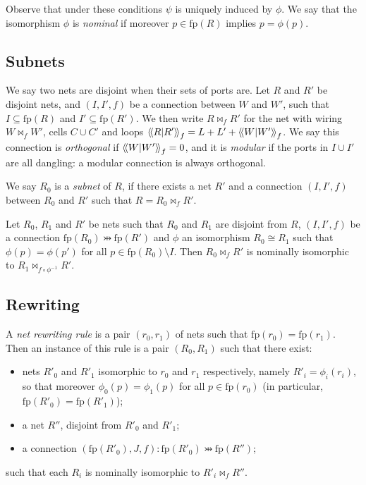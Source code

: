 Observe that under these conditions \(\psi\) is uniquely induced by
\(\phi\). We say that the isomorphism \(\phi\) is \emph{nominal} if
moreover \(p\in\textrm{fp}(R)\) implies \(p=\phi(p)\).

\subsection{Subnets}\label{subnets}

We say two nets are disjoint when their sets of ports are. Let \(R\) and
\(R'\) be disjoint nets, and \((I,I',f)\) be a connection between \(W\)
and \(W'\), such that \(I\subseteq \textrm{fp}(R)\) and
\(I'\subseteq \textrm{fp}(R')\). We then write \(R\bowtie_f{R'}\) for
the net with wiring \(W\bowtie_f{W'}\), cells \(C\cup C'\) and loops
\(\left\langle\!\left\langle R\middle|R'\right\rangle\!\right\rangle_f=L+L'+\left\langle\!\left\langle W\middle|W'\right\rangle\!\right\rangle_f\). We say this connection is
\emph{orthogonal} if \(\left\langle\!\left\langle W\middle|W'\right\rangle\!\right\rangle_f=0\), and it is \emph{modular} if
the ports in \(I\cup I'\) are all dangling: a modular connection is
always orthogonal.

We say \(R_0\) is a \emph{subnet} of \(R\), if there exists a net \(R'\)
and a connection \((I,I',f)\) between \(R_0\) and \(R'\) such that
\(R=R_0\bowtie_f{R'}\).

\begin{lemma}
Let $R_0$, $R_1$ and $R'$ be nets such that $R_0$ and $R_1$
are disjoint from $R$,
$(I,I',f)$ be a connection $\textrm{fp}(R_0)\pinj \textrm{fp}(R')$
and $\phi$ an isomorphism $R_0\cong R_1$ such that
$\phi(p)=\phi(p')$ for all $p\in\textrm{fp}(R_0)\setminus I$.
Then $R_0\bowtie_f{R'}$ is nominally isomorphic to
$R_1\bowtie_{f\circ\phi^{-1}}{R'}$.
\end{lemma}

\subsection{Rewriting}\label{rewriting}

A \emph{net rewriting rule} is a pair \((r_0,r_1)\) of nets such that
\(\textrm{fp}(r_0)=\textrm{fp}(r_1)\). Then an instance of this rule is
a pair \((R_0,R_1)\) such that there exist:
\begin{itemize}
\item nets \(R'_0\) and \(R'_1\) isomorphic to \(r_0\) and \(r_1\)
  respectively, namely \(R'_i=\phi_i(r_i)\), so that moreover
  \(\phi_0(p)=\phi_1(p)\) for all \(p\in\textrm{fp}(r_0)\) (in
  particular, \(\textrm{fp}(R'_0)=\textrm{fp}(R'_1)\));
\item a net \(R''\), disjoint from \(R'_0\) and \(R'_1\);
\item a connection \((\textrm{fp}(R'_0),J,f):\textrm{fp}(R'_0)\pinj \textrm{fp}(R'')\);
\end{itemize}
such that each \(R_i\) is nominally isomorphic to \(R'_i\bowtie_f{R''}\).

